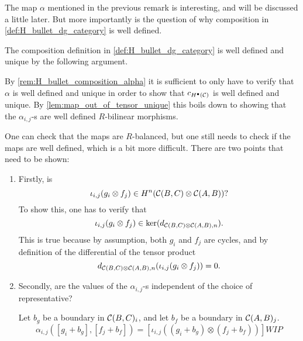 The map \( \alpha \) mentioned in the previous remark is interesting, and will be discussed a little later. But more importantly is the question of why composition in \autoref{def:H_bullet_dg_category} is well defined.
\begin{remark}
    The composition definition in \autoref{def:H_bullet_dg_category} is well defined and unique by the following argument.

    By \autoref{rem:H_bullet_composition_alpha} it is sufficient to only have to verify that \( \alpha \) is well defined and unique in order to show that \( c_{H^\bullet({\mathcal{C}})} \) is well defined and unique. By \autoref{lem:map_out_of_tensor_unique} this boils down to showing that the \( \alpha_{i, j} \)-s are well defined \( R \)-bilinear morphisms.

    One can check that the maps are \( R \)-balanced, but one still needs to check if the maps are well defined, which is a bit more difficult. There are two points that need to be shown:
    \begin{enumerate}
        \item {
            Firstly, is
            \[
                \iota_{i, j}(g_i \otimes f_j) \in H^n({\mathcal{C}}(B, C) \otimes {\mathcal{C}}(A, B))?
            \]
            To show this, one has to verify that
            \[
                \iota_{i, j}(g_i \otimes f_j) \in \ker(d_{{\mathcal{C}}(B, C) \otimes {\mathcal{C}}(A, B), n}).
            \]
            This is true because by assumption, both \( g_i \) and \( f_j \) are cycles, and by definition of the differential of the tensor product
            \[
                d_{{\mathcal{C}}(B, C) \otimes {\mathcal{C}}(A, B), n}(\iota_{i, j}(g_i \otimes f_j)) = 0.
            \]
        }
        \item {
            Secondly, are the values of the \( \alpha_{i, j} \)-s independent of the choice of representative?

            Let \( b_g \) be a boundary in \( {\mathcal{C}}(B, C)_i \), and let \( b_f \) be a boundary in \( {\mathcal{C}}(A, B)_j \).
            \[
                \alpha_{i, j}([g_i + b_g], [f_j + b_f]) = [\iota_{i, j}((g_i + b_g) \otimes (f_j + b_f))] WIP
            \]
        }
    \end{enumerate}
    
\end{remark}

